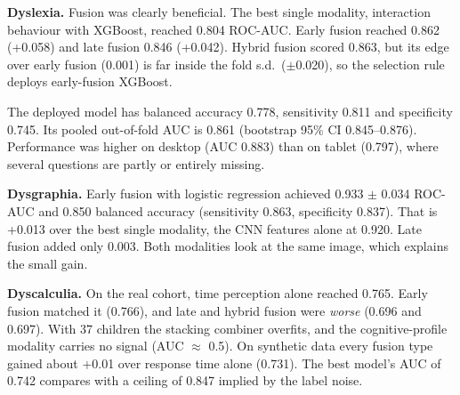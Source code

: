\documentclass[conference]{IEEEtran}
\begin{document}
\textbf{Dyslexia.} Fusion was clearly beneficial. The best single modality, interaction behaviour with XGBoost,
reached 0.804 ROC-AUC. Early fusion reached 0.862 (+0.058) and late fusion 0.846 (+0.042). Hybrid fusion scored
0.863, but its edge over early fusion (0.001) is far inside the fold s.d.\ ($\pm$0.020), so the selection rule
deploys early-fusion XGBoost.

The deployed model has balanced accuracy 0.778, sensitivity 0.811 and specificity 0.745. Its pooled out-of-fold AUC
is 0.861 (bootstrap 95\% CI 0.845--0.876). Performance was higher on desktop (AUC 0.883) than on tablet (0.797), where several
questions are partly or entirely missing.

\textbf{Dysgraphia.} Early fusion with logistic regression achieved 0.933 $\pm$ 0.034 ROC-AUC and 0.850 balanced
accuracy (sensitivity 0.863, specificity 0.837). That is +0.013 over the best single modality, the CNN features
alone at 0.920. Late fusion added only 0.003. Both modalities look at the same image, which explains the small
gain.

\textbf{Dyscalculia.} On the real cohort, time perception alone reached 0.765. Early fusion matched it (0.766), and
late and hybrid fusion were \emph{worse} (0.696 and 0.697). With 37 children the stacking combiner overfits, and the
cognitive-profile modality carries no signal (AUC $\approx$ 0.5). On synthetic data every fusion type gained about
+0.01 over response time alone (0.731). The best model's AUC of 0.742 compares with a ceiling of 0.847 implied by the
label noise.
\end{document}
